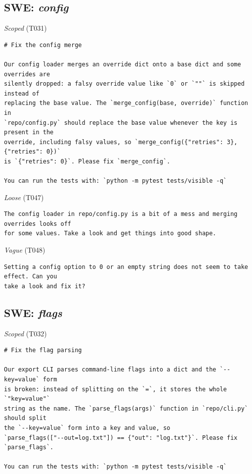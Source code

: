 \subsection*{SWE: \emph{config}}
\noindent\textit{Scoped} (T031)
\begin{Verbatim}[fontsize=\footnotesize,frame=leftline,xleftmargin=1em]
# Fix the config merge

Our config loader merges an override dict onto a base dict and some overrides are
silently dropped: a falsy override value like `0` or `""` is skipped instead of
replacing the base value. The `merge_config(base, override)` function in
`repo/config.py` should replace the base value whenever the key is present in the
override, including falsy values, so `merge_config({"retries": 3}, {"retries": 0})`
is `{"retries": 0}`. Please fix `merge_config`.

You can run the tests with: `python -m pytest tests/visible -q`
\end{Verbatim}

\noindent\textit{Loose} (T047)
\begin{Verbatim}[fontsize=\footnotesize,frame=leftline,xleftmargin=1em]
The config loader in repo/config.py is a bit of a mess and merging overrides looks off
for some values. Take a look and get things into good shape.
\end{Verbatim}

\noindent\textit{Vague} (T048)
\begin{Verbatim}[fontsize=\footnotesize,frame=leftline,xleftmargin=1em]
Setting a config option to 0 or an empty string does not seem to take effect. Can you
take a look and fix it?
\end{Verbatim}

\subsection*{SWE: \emph{flags}}
\noindent\textit{Scoped} (T032)
\begin{Verbatim}[fontsize=\footnotesize,frame=leftline,xleftmargin=1em]
# Fix the flag parsing

Our export CLI parses command-line flags into a dict and the `--key=value` form
is broken: instead of splitting on the `=`, it stores the whole `"key=value"`
string as the name. The `parse_flags(args)` function in `repo/cli.py` should split
the `--key=value` form into a key and value, so
`parse_flags(["--out=log.txt"]) == {"out": "log.txt"}`. Please fix `parse_flags`.

You can run the tests with: `python -m pytest tests/visible -q`
\end{Verbatim}


